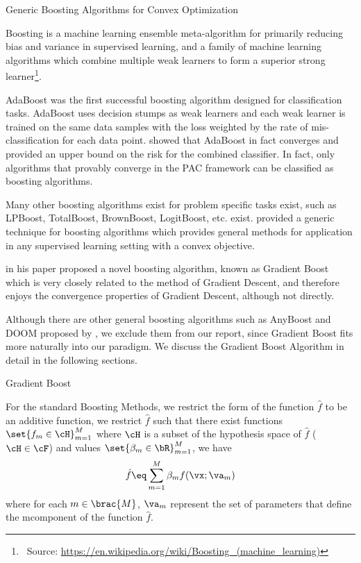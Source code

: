 \documentclass{article}
\begin{document}
\begin{psection}{Generic Boosting Algorithms for Convex Optimization}

	\begin{definition}[Boosting]
		Boosting is a machine learning ensemble meta-algorithm for primarily reducing bias and variance \citep{boost-var} in supervised learning, and a family of machine learning algorithms which combine multiple weak learners to form a superior strong learner\footnote{\ Source: \url{https://en.wikipedia.org/wiki/Boosting_(machine_learning)}}.
	\end{definition}

	AdaBoost \citep{adaboost} was the first successful boosting algorithm designed for classification tasks. AdaBoost uses decision stumps as weak learners and each weak learner is trained on the same data samples with the loss weighted by the rate of mis-classification for each data point. \cite{adaboost} showed that AdaBoost in fact converges and provided an upper bound on the risk for the combined classifier. In fact, only algorithms that provably converge in the PAC framework can be classified as boosting algorithms.

	Many other boosting algorithms exist for problem specific tasks exist, such as LPBoost, TotalBoost, BrownBoost, LogitBoost, etc. exist. \cite{gbm} provided a generic technique for boosting algorithms which provides general methods for application in any supervised learning setting with a convex objective.

	 in his paper proposed a novel boosting algorithm, known as Gradient Boost which is very closely related to the method of Gradient Descent, and therefore enjoys the convergence properties of Gradient Descent, although not directly.

	Although there are other general boosting algorithms such as AnyBoost and DOOM proposed by \cite{anyboost}, we exclude them from our report, since Gradient Boost fits more naturally into our paradigm. We discuss the Gradient Boost Algorithm in detail in the following sections.

	\begin{psubsection}{Gradient Boost}

		For the standard Boosting Methods, we restrict the form of the function $\hat{f}$ to be an additive function, \ie we restrict $\hat{f}$ such that there exist functions $\set{f_m \in \cH}_{m = 1}^M$ where $\cH$ is a subset of the hypothesis space of $\hat{f}$ ($\cH \in \cF$) and values $\set{\beta_m \in \bR}_{m = 1}^M$, we have
		\begin{equation}
			\hat{f} \eq \sum_{m = 1}^M \beta_m f(\vx; \va_m)
		\end{equation}
		where for each $m \in \brac{M}$, $\va_m$ represent the set of parameters that define the m\tth component of the function $\hat{f}$.


\end{psubsection}
\end{psection}
\end{document}
